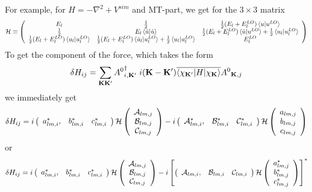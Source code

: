 \documentclass[aps,prb,floatfix,epsfig,singlecolumn,showpacs,preprintnumbers]{revtex4}
\newcommand{\vK}{{\mathbf{K}}}
\newcommand{\cH}{{\cal H}}
\newcommand{\cA}{{\cal A}}
\newcommand{\cB}{{\cal B}}
\newcommand{\cC}{{\cal C}}
\begin{document}
For example, for $H=-\nabla^2+V^{sim}$ and MT-part, we get for the
$3\times 3$ matrix
\begin{eqnarray}
\cH \equiv \left(
\begin{array}{ccc}
E_l & \frac{1}{2} & \frac{1}{2}(E_l+E^{LO}_l) \braket{u|u^{LO}} \\
\frac{1}{2} & E_l \braket{\dot{u}|\dot{u}} & \frac{1}{2}(E_l+E^{LO}_l) \braket{\dot{u}|u^{LO}} +\frac{1}{2}\braket{u_l|u_l^{LO}}\\
\frac{1}{2}(E_l+E^{LO}_l) \braket{u_l|u^{LO}_l}&  \frac{1}{2}(E_l+E^{LO}_l) \braket{\dot{u}_l|u^{LO}_l}+\frac{1}{2}\braket{u_l|u_l^{LO}}& E^{LO}_l
\end{array}
\right)
\end{eqnarray}
To get the component of the force, which takes the form 
\begin{eqnarray}
\delta H_{ij} = \sum_{\vK\vK'}{A^0}^\dagger_{i,\vK'}\; i(\vK-\vK') \overline{\braket{\chi_{\vK'}|H|\chi_\vK}} {A^0}_{\vK,j}
\end{eqnarray}
we immediately get
\begin{eqnarray}
\delta H_{ij} =
i \left(
\begin{array}{ccc}
a_{lm,i}^*, & b_{lm,i}^* & c^*_{lm,i}
\end{array}
\right)
\cH
\left(
\begin{array}{c}
\cA_{lm,j}\\
\cB_{lm,j}\\ 
\cC_{lm,j}
\end{array}
\right)
-i \left(
\begin{array}{ccc}
\cA_{lm,i}^*, & \cB_{lm,i}^* & \cC^*_{lm,i}
\end{array}
\right)
\cH
\left(
\begin{array}{c}
a_{lm,j}\\
b_{lm,j}\\ 
c_{lm,j}
\end{array}
\right)
\end{eqnarray}
or
\begin{eqnarray}
\delta H_{ij} =
i \left(
\begin{array}{ccc}
a_{lm,i}^*, & b_{lm,i}^* & c^*_{lm,i}
\end{array}
\right)
\cH
\left(
\begin{array}{c}
\cA_{lm,j}\\
\cB_{lm,j}\\ 
\cC_{lm,j}
\end{array}
\right)
-i \left[\left(
\begin{array}{ccc}
\cA_{lm,i}, & \cB_{lm,i} & \cC_{lm,i}
\end{array}
\right)
\cH
\left(
\begin{array}{c}
a^*_{lm,j}\\
b^*_{lm,j}\\ 
c^*_{lm,j}
\end{array}
\right)
\right]^*
\end{eqnarray}
\end{document}
